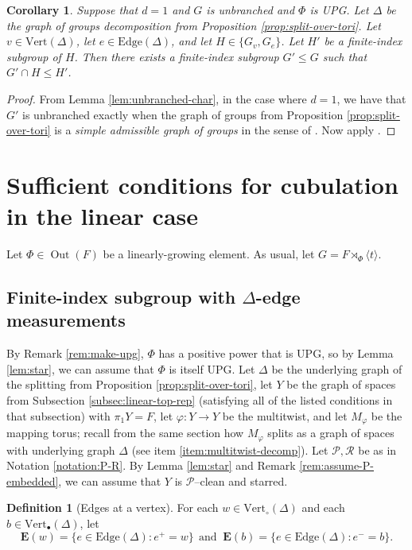 \documentclass[11pt,oneside]{amsart}
\newtheorem{cor}[thm]{Corollary}
\theoremstyle{definition}
\newtheorem{defn}[thm]{Definition}
\DeclareMathOperator{\Out}{Out}
\newcommand{\vertices}{\mathrm{Vert}}
\newcommand{\edges}{\mathrm{Edge}}
\begin{document}
\begin{cor}\label{cor:unbranched-separable}
Suppose that $d=1$ and $G$ is unbranched and $\Phi$ is UPG.  Let $\Delta$ be the graph of groups decomposition from Proposition \ref{prop:split-over-tori}.  Let $v\in\vertices(\Delta)$, let $e\in \edges(\Delta)$, and let $H\in \{G_v,G_e\}$.  Let $H'$ be a finite-index subgroup of $H$.  Then there exists a finite-index subgroup $G'\leq G$ such that $G'\cap H\leq H'$.  
\end{cor}

\begin{proof}
From Lemma \ref{lem:unbranched-char}, in the case where $d=1$, we have that $G'$ is unbranched exactly when the graph of groups from Proposition \ref{prop:split-over-tori} is a \emph{simple admissible graph of groups} in the sense of \cite[Defn. 2.2]{Nguyen:separability}.  Now apply \cite[Thm. 1.2]{Nguyen:separability}.
\end{proof}



\section{Sufficient conditions for cubulation in the linear case}\label{sec:sufficient-conditions-linear}
Let $\Phi\in\Out(F)$ be a linearly-growing element.  As usual, let $G=F\rtimes_\Phi\langle t\rangle$.

\subsection{Finite-index subgroup with $\Delta$-edge measurements}\label{subsec:linear-finite-index}
By Remark \ref{rem:make-upg}, $\Phi$ has a positive power that is UPG, so by Lemma \ref{lem:star}, we can assume that $\Phi$ is itself UPG.  Let $\Delta$ be the underlying graph of the splitting from Proposition \ref{prop:split-over-tori}, let $Y$ be the graph of spaces from Subsection \ref{subsec:linear-top-rep} (satisfying all of the listed conditions in that subsection) with $\pi_1Y=F$, let $\varphi:Y\to Y$ be the multitwist, and let $M_\varphi$ be the mapping torus; recall from the same section how $M_\varphi$ splits as a graph of spaces with underlying graph $\Delta$ (see item \eqref{item:multitwist-decomp}).  Let $\mathcal P,\mathcal R$ be as in Notation \ref{notation:P-R}.  By Lemma \ref{lem:star} and Remark \ref{rem:assume-P-embedded}, we can assume that $Y$ is $\mathcal P$--clean and starred.

\begin{defn}[Edges at a vertex]\label{defn:E-edge-sets}
For each $w\in\vertices_\circ(\Delta)$ and each $b\in\vertices_\bullet(\Delta)$, let
$$\mathbf E(w)=\{e\in\edges(\Delta):e^+=w\}\ \ \text{and }\ \mathbf E(b)=\{e\in\edges(\Delta):e^-=b\}.$$
\end{defn}
\end{document}
